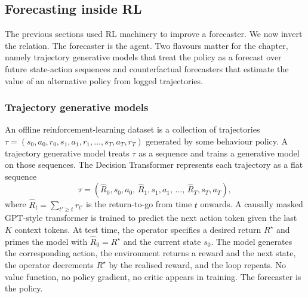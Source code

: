 \subsection{Forecasting inside RL}
\label{sec:forecasting_in_rl}

The previous sections used RL machinery to improve a forecaster. We now
invert the relation. The forecaster is the agent. Two flavours matter for
the chapter, namely trajectory generative models that treat the policy as
a forecast over future state-action sequences and counterfactual
forecasters that estimate the value of an alternative policy from logged
trajectories.

\subsubsection{Trajectory generative models}
\label{sec:trajectory_gen}

An offline reinforcement-learning dataset is a collection of trajectories
$\tau = (s_0, a_0, r_0, s_1, a_1, r_1, \dots, s_T, a_T, r_T)$ generated by
some behaviour policy. A trajectory generative model treats $\tau$ as a
sequence and trains a generative model on those sequences. The
\citet{Chen2021DT} Decision Transformer represents each trajectory as a
flat sequence
\begin{equation}
\tau = (\widehat R_0, s_0, a_0,\, \widehat R_1, s_1, a_1,\, \dots,\,
  \widehat R_T, s_T, a_T),
\label{eq:dt_sequence}
\end{equation}
where $\widehat R_t = \sum_{t' \ge t} r_{t'}$ is the return-to-go from
time $t$ onwards. A causally masked GPT-style transformer is trained to
predict the next action token given the last $K$ context tokens. At test
time, the operator specifies a desired return $R^\star$ and primes the
model with $\widehat R_0 = R^\star$ and the current state $s_0$. The model
generates the corresponding action, the environment returns a reward and
the next state, the operator decrements $R^\star$ by the realised reward,
and the loop repeats. No value function, no policy gradient, no critic
appears in training. The forecaster is the policy.

